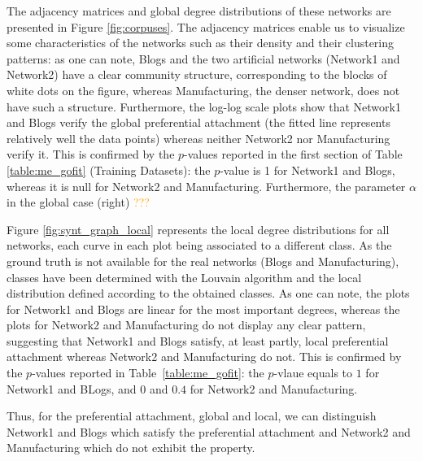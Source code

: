 The adjacency matrices and global degree distributions of these networks are presented in Figure \ref{fig:corpuses}. The adjacency matrices enable us to visualize some characteristics of the networks such as their density and their clustering patterns: as one can note, Blogs and the two artificial networks (Network1 and Network2) have a clear community structure, corresponding to the blocks of white dots on the figure, whereas Manufacturing, the denser network, does not have such a structure. Furthermore, the log-log scale plots show that Network1 and Blogs verify the  global preferential attachment (the fitted line represents relatively well the data points) whereas neither Network2 nor Manufacturing verify it. This is confirmed by the $p$-values reported in the first section of Table \ref{table:me_gofit} (Training Datasets): the $p$-value is 1 for Network1 and Blogs, whereas it is null for Network2 and Manufacturing. Furthermore, the parameter $\alpha$ in the global case (right) \textcolor{orange}{???}

Figure \ref{fig:synt_graph_local} represents the local degree distributions for all networks, each curve in each plot being associated to a different class. As the ground truth is not available for the real networks (Blogs and Manufacturing), classes have been determined with the Louvain algorithm \cite{Blondel2008} and the local distribution defined according to the obtained classes. As one can note, the plots for Network1 and Blogs are linear for the most important degrees, whereas the plots for Network2 and Manufacturing do not display any clear pattern, suggesting that Network1 and Blogs satisfy, at least partly, local preferential attachment whereas Network2 and Manufacturing do not. This is confirmed by the $p$-values reported in Table~\ref{table:me_gofit}: the $p$-vlaue equals to $1$ for Network1 and BLogs, and $0$ and $0.4$ for Network2 and Manufacturing.

Thus, for the preferential attachment, global and local, we can distinguish Network1 and Blogs which satisfy the preferential attachment and Network2 and Manufacturing which do not exhibit the property.

